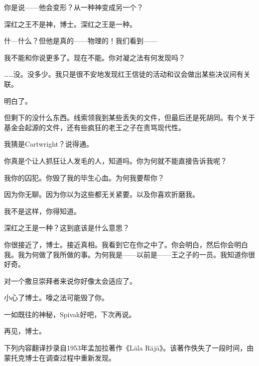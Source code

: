 \begin{scpbox}
你是说——他会变形？从一种神变成另一个？

深红之王不是神，博士。深红之王是一种。

什—什么？但他是真的——物理的！我们看到——

我不能和你说更多了。现在不能。你对凝之法有何发现吗？

……没。没多少。我只是很不安地发现红王信徒的活动和议会做出某些决议间有关联。

明白了。

但剩下的没什么东西。线索领我到某些丢失的文件，但最后还是死胡同。有个关于基金会起源的文件，还有些疯狂的老王之子在责骂现代性。

我猜是Cartwright？说得通。

你真是个让人抓狂让人发毛的人，知道吗。你为何就不能直接告诉我呢？

我你的囚犯。你毁了我的毕生心血。为何我要帮你？

因为你无聊。因为你以为这些都无关紧要。以及你喜欢折磨我。

我不是这样，你得知道。

深红之王是一种？这到底该是什么意思？

你很接近了，博士。接近真相。我看到它在你之中了。你会明白，然后你会明白我。我为何做了我所做的事。为何我是——以前是——王之子的一员。我知道你很好奇。

对一个撒旦崇拜者来说你好像太会适应了。

小心了博士。嚎之法可能毁了你。

一如既往的神秘，Spivak好吧，下次再说。

再见，博士。


\end{scpbox}

\hr

下列内容翻译抄录自1953年孟加拉著作《Lāla Rājā》。该著作佚失了一段时间，由蒙托克博士在调查过程中重新发现。

